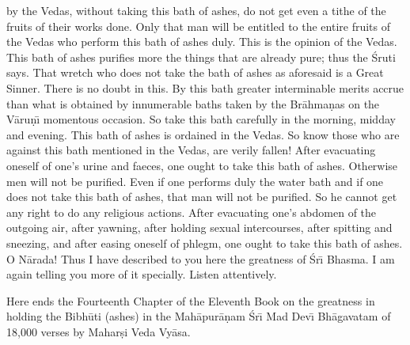 by the Vedas, without taking this bath of ashes, do not get even a tithe of the fruits of their works done. Only that man will be entitled to the entire fruits of the Vedas who perform this bath of ashes duly. This is the opinion of the Vedas. This bath of ashes purifies more the things that are already pure; thus the \'Sruti says. That wretch who does not take the bath of ashes as aforesaid is a Great Sinner. There is no doubt in this. By this bath greater interminable merits accrue than what is obtained by innumerable baths taken by the Br\=ahma\d{n}as on the V\=aru\d{n}\={\i} momentous occasion. So take this bath carefully in the morning, midday and evening. This bath of ashes is ordained in the Vedas. So know those who are against this bath mentioned in the Vedas, are verily fallen! After evacuating oneself of one's urine and faeces, one ought to take this bath of ashes. Otherwise men will not be purified. Even if one performs duly the water bath and if one does not take this bath of ashes, that man will not be purified. So he cannot get any right to do any religious actions. After evacuating one's abdomen of the outgoing air, after yawning, after holding sexual intercourses, after spitting and sneezing, and after easing oneself of phlegm, one ought to take this bath of ashes. O N\=arada! Thus I have described to you here the greatness of \'Sr\={\i} Bhasma. I am again telling you more of it specially. Listen attentively.

Here ends the Fourteenth Chapter of the Eleventh Book on the greatness in holding the Bibh\=uti (ashes) in the Mah\=apur\=a\d{n}am \'Sr\={\i} Mad Dev\={\i} Bh\=agavatam of 18,000 verses by Mahar\d{s}i Veda Vy\=asa.



